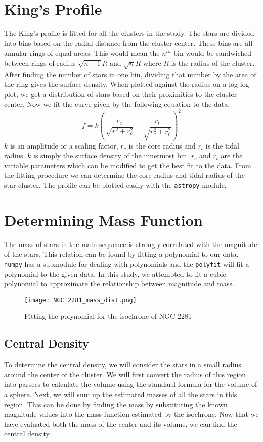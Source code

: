 \section{King's Profile}
The King's profile\citep{kingprofile} is fitted for all the clusters in the study. The stars are divided into bins based on the radial distance from the cluster center. These bins are all annular rings of equal areas. This would mean the $n^{th}$ bin would be sandwiched between rings of radius $\sqrt{n-1}R$ and $\sqrt{n}R$ where $R$ is the radius of the cluster. After finding the number of stars in one bin, dividing that number by the area of the ring gives the surface density. When plotted against the radius on a log-log plot, we get a distribution of stars based on their proximities to the cluster center. Now we fit the curve given by the following equation to the data.
$$f = k \left( \frac{r_c}{\sqrt{r^2+r_c^2}} - \frac{r_t}{\sqrt{r_c^2+r_t^2}} \right) ^2$$
$k$ is an amplitude or a scaling factor, $r_c$ is the core radius and $r_t$ is the tidal radius. $k$ is simply the surface density of the innermost bin. $r_c$ and $r_t$ are the variable parameters which can be modified to get the best fit to the data. From the fitting procedure we can determine the core radius and tidal radius of the star cluster. The profile can be plotted easily with the \lstinline{astropy}\citep{astropy} module.

\section{Determining Mass Function}
The mass of stars in the main sequence is strongly correlated with the magnitude of the stars. This relation can be found by fitting a polynomial to our data. \lstinline{numpy} {}has a submodule for dealing with polynomials and the \lstinline{polyfit} {}will fit a polynomial to the given data. In this study, we attempted to fit a cubic polynomial to approximate the relationship between magnitude and mass. 

\begin{figure}[h]
	\centering
	\texttt{[image: NGC 2281\_mass\_dist.png]}
	\caption{Fitting the polynomial for the isochrone of NGC 2281}
	\label{fig:im6}
\end{figure}

\subsection{Central Density}
To determine the central density, we will consider the stars in a small radius around the center of the cluster. We will first convert the radius of this region into parsecs to calculate the volume using the standard formula for the volume of a sphere. Next, we will sum up the estimated masses of all the stars in this region. This can be done by finding the mass by substituting the known magnitude values into the mass function estimated by the isochrone. Now that we have evaluated both the mass of the center and its volume, we can find the central density.

